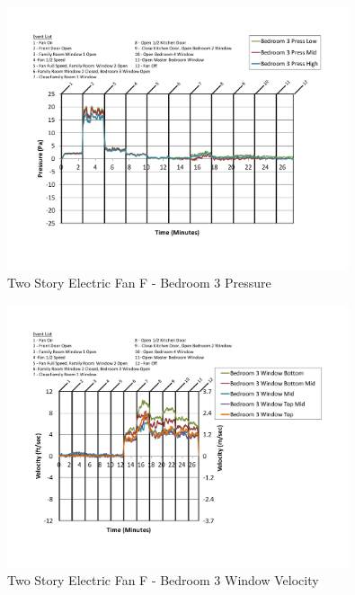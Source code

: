 \documentclass{article}
\begin{document}
\begin{appendices}
	\begin{figure}[H]
		\centering
		\includegraphics[height=3.05in,trim=0.67in 1.1in 0.67in 0.8in,clip=true]{0_Images/Results_Charts/ColdFlow/Two_Story/Electric/F/Bedroom_3_Pressure.pdf}
		\caption{Two Story Electric Fan F - Bedroom 3 Pressure}
	\end{figure}
 

	\begin{figure}[H]
		\centering
		\includegraphics[height=3.05in,trim=0.67in 1.1in 0.67in 0.8in,clip=true]{0_Images/Results_Charts/ColdFlow/Two_Story/Electric/F/Bedroom_3_Window_Velocity.pdf}
		\caption{Two Story Electric Fan F - Bedroom 3 Window Velocity}
	\end{figure}
 
	\clearpage


\end{appendices}
\end{document}
